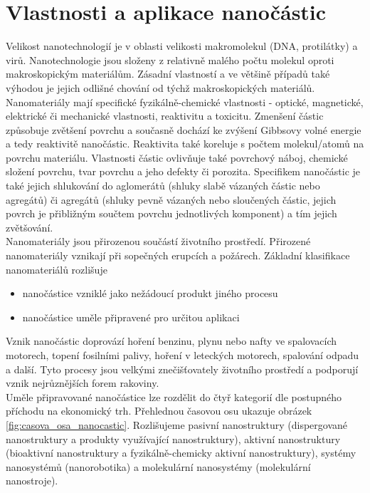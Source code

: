 \chapter{Vlastnosti a aplikace nanočástic}

Velikost nanotechnologií je v oblasti velikosti makromolekul (DNA, protilátky) a virů. Nanotechnologie jsou složeny z relativně malého počtu molekul oproti makroskopickým materiálům. Zásadní vlastností a ve většině případů také výhodou je jejich odlišné chování od týchž makroskopických materiálů. Nanomateriály mají specifické fyzikálně-chemické vlastnosti - optické, magnetické, elektrické či mechanické vlastnosti, reaktivitu a toxicitu. Zmenšení částic způsobuje zvětšení povrchu a současně dochází ke zvýšení Gibbsovy volné energie a tedy reaktivitě nanočástic. Reaktivita také koreluje s počtem molekul/atomů na povrchu materiálu. Vlastnosti částic ovlivňuje také povrchový náboj, chemické složení povrchu, tvar povrchu a jeho defekty či porozita. Specifikem nanočástic je také jejich shlukování do aglomerátů (shluky slabě vázaných částic nebo agregátů) či agregátů (shluky pevně vázaných nebo sloučených částic, jejich povrch je přibližným součtem povrchu jednotlivých komponent) a tím jejich zvětšování. \cite{nohavica2011,filipova2012}  \\

Nanomateriály jsou přirozenou součástí životního prostředí. Přirozené nanomateriály vznikají při sopečných erupcích a požárech. Základní klasifikace nanomateriálů rozlišuje
    \begin{itemize}
        \item nanočástice vzniklé jako nežádoucí produkt jiného procesu
        \item nanočástice uměle připravené pro určitou aplikaci
    \end{itemize}
    
Vznik nanočástic doprovází hoření benzinu, plynu nebo nafty ve spalovacích motorech, topení fosilními palivy, hoření v leteckých motorech, spalování odpadu a další. Tyto procesy jsou velkými znečišťovately životního prostředí a podporují vznik nejrůznějších forem rakoviny. \cite{nohavica2011}\\

Uměle připravované nanočástice lze rozdělit do čtyř kategorií dle postupného příchodu na ekonomický trh. Přehlednou časovou osu ukazuje obrázek \ref{fig:casova_osa_nanocastic}. Rozlišujeme pasivní nanostruktury (dispergované nanostruktury a produkty využívající nanostruktury), aktivní nanostruktury (bioaktivní nanostruktury a fyzikálně-chemicky aktivní nanostruktury), systémy nanosystémů (nanorobotika) a molekulární nanosystémy (molekulární nanostroje). \cite{filipova2012}

